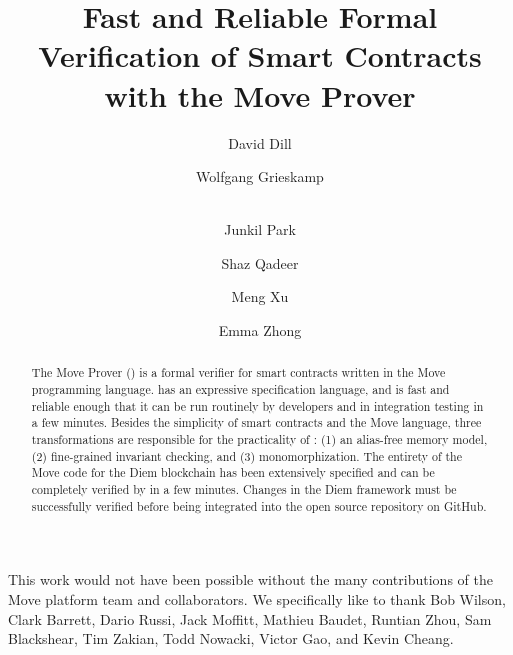 \documentclass[runningheads]{llncs}
\begin{document}
\author{
  David Dill \and Wolfgang Grieskamp \and \\ Junkil
  Park \and Shaz Qadeer \and Meng Xu
  \and Emma Zhong
}


\title{Fast and Reliable Formal Verification of Smart Contracts with the Move Prover}

\maketitle
\begin{abstract}
  The Move Prover (\MVP) is a formal verifier for smart contracts
  written in the Move programming language. \MVP has an expressive
  specification language, and is fast and reliable enough that it can
  be run routinely by developers and in integration testing in a few
  minutes. Besides the simplicity of smart contracts and the Move
  language, three transformations are responsible for the practicality
  of \MVP: (1) an alias-free memory model, (2) fine-grained invariant
  checking, and (3) monomorphization.  The entirety of the Move code for
  the Diem blockchain has been extensively specified and can be
  completely verified by \MVP in a few minutes. Changes in the Diem
  framework must be successfully verified before being integrated into
  the open source repository on GitHub.
\end{abstract}








\vspace{-0.5ex}

This work would not have been possible without the many contributions of the
Move platform team and collaborators.  We specifically like to thank Bob Wilson,
Clark Barrett, Dario Russi, Jack Moffitt, Mathieu Baudet, Runtian Zhou, Sam
Blackshear, Tim Zakian, Todd Nowacki, Victor Gao, and Kevin Cheang.




\appendix
\newpage

\newpage

\end{document}
